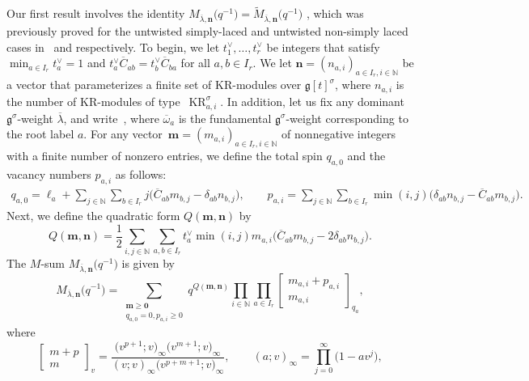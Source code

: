 \documentclass[10pt,a4paper]{amsart}
\numberwithin{equation}{section}
\DeclareMathOperator{\KR}{KR}
\begin{document}
Our first result involves the identity $M_{\overline{\lambda},\mathbf{n}}\bigl(q^{-1}\bigr)=\tilde{M}_{\overline{\lambda},\mathbf{n}}\bigl(q^{-1}\bigr)$ \cite[Conjecture~4.3]{HKOTT02}, which was previously proved for the untwisted simply-laced and untwisted non-simply laced cases in~\cite[Theorem~5.1]{DFK14} and \cite[Theorem~1.2]{Lin21} respectively. To begin, we let $t_1^{\vee},\dots,t_r^{\vee}$ be integers that satisfy~${\min_{a\in I_r}t_a^{\vee}=1}$ and $t_a^{\vee}\overline{C}_{ab}= t_b^{\vee}\overline{C}_{ba}$ for all $a,b\in I_r$. We let $\mathbf{n}=(n_{a,i})_{a\in I_r,i\in\mathbb{N}}$ be a vector that parameterizes a finite set of KR-modules over $\mathfrak{g}[t]^{\sigma}$, where $n_{a,i}$ is the number of KR-modules of type~$\KR_{a,i}^{\sigma}$. In addition, let us fix any dominant $\mathfrak{g}^{\sigma}$-weight $\overline{\lambda}$, and write~, where $\overline{\omega}_a$ is the fundamental $\mathfrak{g}^{\sigma}$-weight corresponding to the root label $a$. For any vector~${\mathbf{m}=(m_{a,i})_{a\in I_r,i\in\mathbb{N}}}$ of nonnegative integers with a finite number of nonzero entries, we define the total spin $q_{a,0}$ and the vacancy numbers $p_{a,i}$ as follows:
\begin{gather*}
q_{a,0}=\ell_a+\sum_{j\in\mathbb{N}}\sum_{b\in I_r}j\bigl(\overline{C}_{ab}m_{b,j}-\delta_{ab}n_{b,j}\bigr),\qquad
p_{a,i}=\sum_{j\in\mathbb{N}}\sum_{b\in I_r}\min(i,j)\bigl(\delta_{ab}n_{b,j}-\overline{C}_{ab}m_{b,j}\bigr).
\end{gather*}
Next, we define the quadratic form $Q(\mathbf{m},\mathbf{n})$ by
\[
Q(\mathbf{m},\mathbf{n})=\frac{1}{2}
\sum_{i,j\in\mathbb{N}}\sum_{a,b\in I_r}
t_a^{\vee}\min(i,j)m_{a,i}\bigl(\overline{C}_{ab}m_{b,j}-2\delta_{ab}n_{b,j}\bigr).
\]
The $M$-sum $M_{\overline{\lambda},\mathbf{n}}\bigl(q^{-1}\bigr)$ is given by \cite[equation~(4.5)]{HKOTT02}
\begin{equation}\label{eq:1.5}
M_{\overline{\lambda},\mathbf{n}}\bigl(q^{-1}\bigr)
=\sum_{\substack{\mathbf{m}\geq\mathbf{0}\\q_{a,0}=0,p_{a,i}\geq0}}q^{Q(\mathbf{m},\mathbf{n})}\prod_{i\in\mathbb{N}}\prod_{a\in I_r}
\begin{bmatrix}m_{a,i}+p_{a,i}\\m_{a,i}\end{bmatrix}_{q_a},
\end{equation}
where
\begin{equation*}
\begin{bmatrix}m+p\\m\end{bmatrix}_v=\frac{\bigl(v^{p+1};v\bigr)_{\infty}\bigl(v^{m+1};v\bigr)_{\infty}}{(v;v)_{\infty}\bigl(v^{p+m+1};v\bigr)_{\infty}},\qquad (a;v)_{\infty}=\prod_{j=0}^{\infty}\bigl(1-av^j\bigr),
\end{equation*}
\end{document}
